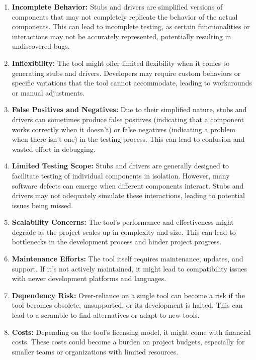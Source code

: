 \documentclass{article}
\begin{document}
\begin{enumerate}

\item \textbf{Incomplete Behavior:} Stubs and drivers are simplified versions of components that may not completely replicate the behavior of the actual components. This can lead to incomplete testing, as certain functionalities or interactions may not be accurately represented, potentially resulting in undiscovered bugs.

\item \textbf{Inflexibility:} The tool might offer limited flexibility when it comes to generating stubs and drivers. Developers may require custom behaviors or specific variations that the tool cannot accommodate, leading to workarounds or manual adjustments.

\item \textbf{False Positives and Negatives:} Due to their simplified nature, stubs and drivers can sometimes produce false positives (indicating that a component works correctly when it doesn't) or false negatives (indicating a problem when there isn't one) in the testing process. This can lead to confusion and wasted effort in debugging.

\item \textbf{Limited Testing Scope:} Stubs and drivers are generally designed to facilitate testing of individual components in isolation. However, many software defects can emerge when different components interact. Stubs and drivers may not adequately simulate these interactions, leading to potential issues being missed.

\item \textbf{Scalability Concerns:} The tool's performance and effectiveness might degrade as the project scales up in complexity and size. This can lead to bottlenecks in the development process and hinder project progress.

\item \textbf{Maintenance Efforts:} The tool itself requires maintenance, updates, and support. If it's not actively maintained, it might lead to compatibility issues with newer development platforms and languages.

\item \textbf{Dependency Risk:} Over-reliance on a single tool can become a risk if the tool becomes obsolete, unsupported, or its development is halted. This can lead to a scramble to find alternatives or adapt to new tools.

\item \textbf{Costs:} Depending on the tool's licensing model, it might come with financial costs. These costs could become a burden on project budgets, especially for smaller teams or organizations with limited resources.

\end{enumerate}
\end{document}
